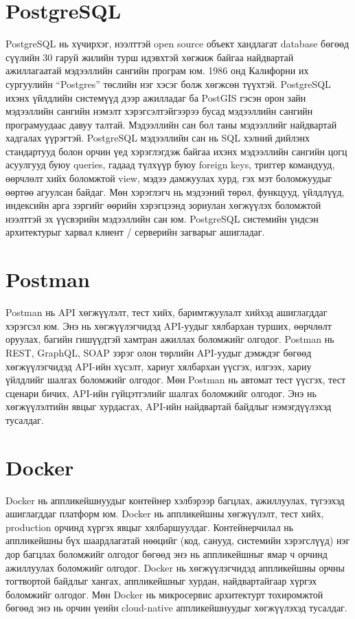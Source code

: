 \section{PostgreSQL}
PostgreSQL нь хүчирхэг, нээлттэй open source объект хандлагат database бөгөөд сүүлийн 30 гаруй жилийн турш идэвхтэй хөгжиж байгаа найдвартай ажиллагаатай мэдээллийн сангийн програм юм. 1986 онд Калифорни их сургуулийн “Postgres” төслийн нэг хэсэг болж хөгжсөн түүхтэй. PostgreSQL ихэнх үйлдлийн системүүд дээр ажилладаг ба PostGIS гэсэн орон зайн мэдээллийн сангийн нэмэлт хэрэгсэлтэйгээрээ бусад мэдээллийн сангийн програмуудаас давуу талтай. Мэдээллийн сан бол таны мэдээллийг найдвартай хадгалах үүрэгтэй. PostgreSQL мэдээллийн сан нь SQL хэлний дийлэнх стандартууд болон орчин үед хэрэглэгдэж байгаа ихэнх мэдээллийн сангийн цогц асуулгууд буюу queries, гадаад түлхүүр буюу foreign keys, триггер командууд, өөрчлөлт хийх боломжтой view, мэдээ дамжуулах хурд, гэх мэт боломжуудыг өөртөө агуулсан байдаг. Мөн хэрэглэгч нь мэдээний төрөл, функцууд, үйлдлүүд, индексийн арга зэргийг өөрийн хэрэгцээнд зориулан хөгжүүлэх боломжтой нээлттэй эх үүсвэрийн мэдээллийн сан юм. PostgreSQL системийн үндсэн архитектурыг харвал клиент / серверийн загварыг ашигладаг.

\section{Postman}
Postman нь API хөгжүүлэлт, тест хийх, баримтжуулалт хийхэд ашиглагддаг хэрэгсэл юм. Энэ нь хөгжүүлэгчидэд API-уудыг хялбархан турших, өөрчлөлт оруулах, багийн гишүүдтэй хамтран ажиллах боломжийг олгодог. Postman нь REST, GraphQL, SOAP зэрэг олон төрлийн API-уудыг дэмждэг бөгөөд хөгжүүлэгчидэд API-ийн хүсэлт, хариуг хялбархан үүсгэх, илгээх, хариу үйлдлийг шалгах боломжийг олгодог. Мөн Postman нь автомат тест үүсгэх, тест сценари бичих, API-ийн гүйцэтгэлийг шалгах боломжийг олгодог. Энэ нь хөгжүүлэлтийн явцыг хурдасгах, API-ийн найдвартай байдлыг нэмэгдүүлэхэд тусалдаг.

\section{Docker}
Docker нь аппликейшнуудыг контейнер хэлбэрээр багцлах, ажиллуулах, түгээхэд ашиглагддаг платформ юм. Docker нь аппликейшны хөгжүүлэлт, тест хийх, production орчинд хүргэх явцыг хялбаршуулдаг. Контейнерчилал нь аппликейшны бүх шаардлагатай нөөцийг (код, санууд, системийн хэрэгслүүд) нэг дор багцлах боломжийг олгодог бөгөөд энэ нь аппликейшныг ямар ч орчинд ажиллуулах боломжийг олгодог. Docker нь хөгжүүлэгчидэд аппликейшны орчны тогтвортой байдлыг хангах, аппликейшныг хурдан, найдвартайгаар хүргэх боломжийг олгодог. Мөн Docker нь микросервис архитектурт тохиромжтой бөгөөд энэ нь орчин үеийн cloud-native аппликейшнуудыг хөгжүүлэхэд тусалдаг.